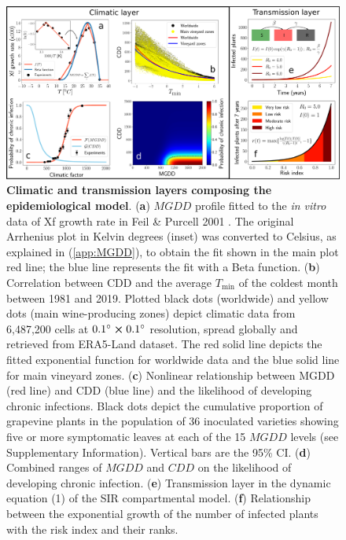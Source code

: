 \begin{figure}[t!]
    \centering
    \includegraphics[width=\textwidth]{Figures/Fig1.pdf}
    \caption{\textbf{Climatic and transmission layers composing the
            epidemiological model}. (\textbf{a}) $MGDD$ profile fitted to the
        \textit{in
            vitro } data of Xf growth rate in Feil \& Purcell 2001
        \cite{Feil2001}. The
        original Arrhenius plot in Kelvin degrees (inset) was converted to
        Celsius, as
        explained in (\cref{app:MGDD}), to obtain the fit shown in the
        main
        plot red line; the blue line represents the fit with a Beta function.
        (\textbf{b}) Correlation between CDD and the average $T_{\textrm{min}}$
        of the
        coldest month between 1981 and 2019. Plotted black dots (worldwide) and
        yellow
        dots (main wine-producing zones) depict climatic data from 6,487,200
        cells at
        $\SI{0.1}{\degree} \cross \SI{0.1}{\degree}$ resolution, spread
        globally and
        retrieved from ERA5-Land dataset. The red solid line depicts the fitted
        exponential function for worldwide data and the blue solid line for
        main
        vineyard zones. (\textbf{c}) Nonlinear relationship between MGDD (red
        line) and
        CDD (blue line) and the likelihood of developing chronic infections.
        Black dots
        depict the cumulative proportion of grapevine plants in the population
        of $36$
        inoculated varieties showing five or more symptomatic leaves at each of
        the 15
        $MGDD$ levels (see Supplementary Information). Vertical bars are the
        95\% CI.
        (\textbf{d}) Combined ranges of $MGDD$ and $CDD$ on the likelihood of
        developing chronic infection. (\textbf{e}) Transmission layer in the
        dynamic
        equation (1) of the SIR compartmental model. (\textbf{f}) Relationship
        between
        the exponential growth of the number of infected plants with the risk
        index and
        their ranks.}
    \label{fig1}
\end{figure}

